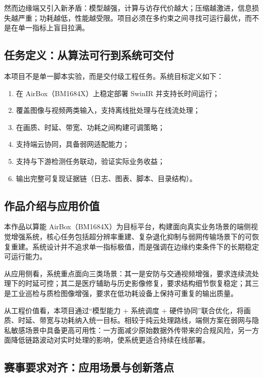 \documentclass[12pt,a4paper]{ctexart}
\begin{document}
然而边缘端又引入新矛盾：模型越强，计算与访存代价越大；压缩越激进，信息损失越严重；功耗越低，性能越受限。项目必须在多约束之间寻找可运行最优，而不是在单一指标上盲目拉满。

\subsection{任务定义：从算法可行到系统可交付}

本项目不是单一脚本实验，而是交付级工程任务。系统目标定义如下：
\begin{enumerate}
  \item 在 AirBox（BM1684X）上稳定部署 SwinIR 并支持长时间运行；
  \item 覆盖图像与视频两类输入，支持离线批处理与在线流处理；
  \item 在画质、时延、带宽、功耗之间构建可调策略；
  \item 支持端云协同，具备弱网适配能力；
  \item 支持与下游检测任务联动，验证实际业务收益；
  \item 输出完整可复现证据链（日志、图表、脚本、目录结构）。
\end{enumerate}

\subsection{作品介绍与应用价值}

本作品以算能 AirBox（BM1684X）为目标平台，构建面向真实业务场景的端侧视觉增强系统，核心任务包括超分辨率重建、复杂退化抑制与弱网传输场景下的可恢复重建。系统设计并不追求单一指标极值，而是强调在边缘约束条件下的长期稳定可运行能力。

从应用侧看，系统重点面向三类场景：其一是安防与交通视频增强，要求连续流处理下的时延可控；其二是医疗辅助与历史影像修复，要求结构细节恢复稳定；其三是工业巡检与质检图像增强，要求在低功耗设备上保持可重复的输出质量。

从工程价值看，本项目通过“模型能力 + 系统调度 + 硬件协同”联合优化，将画质、时延、带宽与功耗纳入统一目标。相较于纯云处理路线，端侧方案在弱网与隐私敏感场景中具备更高可用性：一方面减少原始数据外传带来的合规风险，另一方面降低链路波动对实时处理的影响，使系统更适合持续在线部署。

\subsection{赛事要求对齐：应用场景与创新落点}
\end{document}

